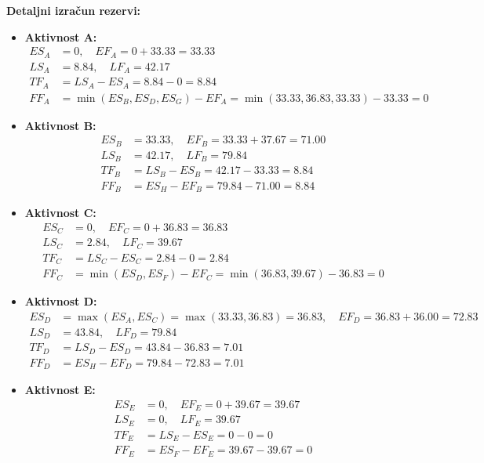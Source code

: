 \documentclass[12pt,a4paper]{article}
\begin{document}
\textbf{Detaljni izračun rezervi:}

\begin{itemize}
\item \textbf{Aktivnost A:}
  \begin{align}
  ES_A &= 0, \quad EF_A = 0 + 33.33 = 33.33 \\
  LS_A &= 8.84, \quad LF_A = 42.17 \\
  TF_A &= LS_A - ES_A = 8.84 - 0 = 8.84 \\
  FF_A &= \min(ES_B, ES_D, ES_G) - EF_A = \min(33.33, 36.83, 33.33) - 33.33 = 0
  \end{align}

\item \textbf{Aktivnost B:}
  \begin{align}
  ES_B &= 33.33, \quad EF_B = 33.33 + 37.67 = 71.00 \\
  LS_B &= 42.17, \quad LF_B = 79.84 \\
  TF_B &= LS_B - ES_B = 42.17 - 33.33 = 8.84 \\
  FF_B &= ES_H - EF_B = 79.84 - 71.00 = 8.84
  \end{align}

\item \textbf{Aktivnost C:}
  \begin{align}
  ES_C &= 0, \quad EF_C = 0 + 36.83 = 36.83 \\
  LS_C &= 2.84, \quad LF_C = 39.67 \\
  TF_C &= LS_C - ES_C = 2.84 - 0 = 2.84 \\
  FF_C &= \min(ES_D, ES_F) - EF_C = \min(36.83, 39.67) - 36.83 = 0
  \end{align}

\item \textbf{Aktivnost D:}
  \begin{align}
  ES_D &= \max(ES_A, ES_C) = \max(33.33, 36.83) = 36.83, \quad EF_D = 36.83 + 36.00 = 72.83 \\
  LS_D &= 43.84, \quad LF_D = 79.84 \\
  TF_D &= LS_D - ES_D = 43.84 - 36.83 = 7.01 \\
  FF_D &= ES_H - EF_D = 79.84 - 72.83 = 7.01
  \end{align}

\item \textbf{Aktivnost E:}
  \begin{align}
  ES_E &= 0, \quad EF_E = 0 + 39.67 = 39.67 \\
  LS_E &= 0, \quad LF_E = 39.67 \\
  TF_E &= LS_E - ES_E = 0 - 0 = 0 \\
  FF_E &= ES_F - EF_E = 39.67 - 39.67 = 0
  \end{align}


\end{itemize}
\end{document}
